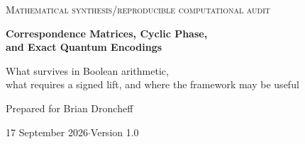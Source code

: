 \documentclass[11pt,a4paper]{article}
\theoremstyle{definition}\newtheorem{definition}[theorem]{Definition}
\theoremstyle{remark}\newtheorem{remark}[theorem]{Remark}
\newcommand{\F}{\mathbb F}
\numberwithin{equation}{section}
\begin{document}
\begin{titlepage}
\centering
\vspace*{11mm}
{\small\scshape Mathematical synthesis\quad /\quad reproducible computational audit\par}
\vspace{12mm}
{\LARGE\bfseries Correspondence Matrices, Cyclic Phase,\\[5pt] and Exact Quantum Encodings\par}
\vspace{6mm}
{\large What survives in Boolean arithmetic,\\what requires a signed lift, and where the framework may be useful\par}
\vspace{12mm}
{\large Prepared for Brian Droncheff\par}
\vspace{3mm}
{17 September 2026\quad $\cdot$\quad Version 1.0\par}
\vspace{12mm}
\begin{minipage}{0.91\textwidth}
\begin{abstract}
This paper consolidates and audits an exploration beginning with Droncheff's correspondence matrices (CMs), which encode two-input Boolean predicates as binary $2\times2$ arrays. Clockwise rotation supplies a faithful $C_4$ action on the four atomic CM features. With an explicitly added cyclic-convolution product, these arrays form $\F_2[C_4]$. XOR cancellation, rotational correlations, and a conditional uniqueness theorem for normalized Hamming measure are established. Fresh exhaustive checks of all $65{,}536$ two-branch operators confirm that global Hamming and full integer-correlation preservation leave only $32$ phase-permutation operators. Thus these particular Boolean metrics do not provide a Hadamard-like mixer.


\end{abstract}
\end{minipage}
\end{titlepage}
\end{document}
